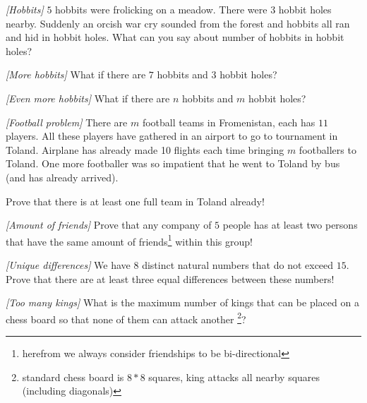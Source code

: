 

%


\noindent 

\begin{problem}
\textit{[Hobbits]}
$5$ hobbits were frolicking on a meadow. There were $3$ hobbit holes nearby. Suddenly an orcish war cry sounded from the forest and hobbits all ran and hid in hobbit holes. What can you say about number of hobbits in hobbit holes?
\end{problem}


\begin{problem}
\textit{[More hobbits]}
What if there are $7$ hobbits and $3$ hobbit holes?
\end{problem}

\begin{problem}
\textit{[Even more hobbits]}
What if there are $n$ hobbits and $m$ hobbit holes?
\end{problem}

\begin{problem}
\textit{[Football problem]}
There are $m$ football teams in Fromenistan, each has $11$ players. All these players have gathered in an airport to go to tournament in Toland. Airplane has already made 10 flights each time bringing $m$ footballers to Toland. One more footballer was so impatient that he went to Toland by bus (and has already arrived).  

Prove that there is at least one full team in Toland already!
\end{problem}

\begin{problem}
\textit{[Amount of friends]}
Prove that any company of $5$ people has at least two persons that have the same amount of friends\footnote{herefrom we always consider friendships to be bi-directional} within this group!
\end{problem}

\begin{problem}
\textit{[Unique differences]}
We have $8$ distinct natural numbers that do not exceed $15$. Prove that there are at least three equal differences between these numbers!
\end{problem}

\begin{problem}
\textit{[Too many kings]}
What is the maximum number of kings that can be placed on a chess board so that none of them can attack another \footnote{standard chess board is $8*8$ squares, king attacks all nearby squares (including diagonals)}?
\end{problem}

